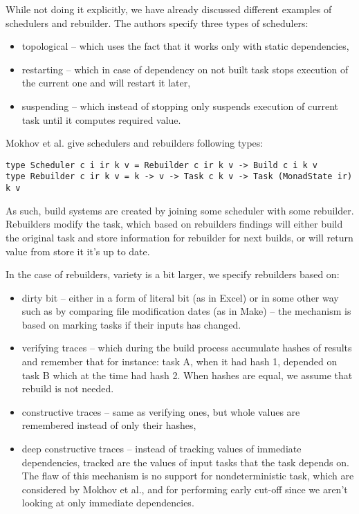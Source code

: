 While not doing it explicitly, we have already discussed different examples of schedulers and rebuilder. The authors specify three types of schedulers:

\begin{itemize}
\item topological -- which uses the fact that it works only with static dependencies,
\item restarting -- which in case of dependency on not built task stops execution of the current one and will restart it later,
\item suspending -- which instead of stopping only suspends execution of current task until it computes required value.
\end{itemize}

Mokhov et al. give schedulers and rebuilders following types:

\begin{lstlisting}
type Scheduler c i ir k v = Rebuilder c ir k v -> Build c i k v
type Rebuilder c ir k v = k -> v -> Task c k v -> Task (MonadState ir) k v
\end{lstlisting}


As such, build systems are created by joining some scheduler with some rebuilder. Rebuilders modify the task, which based on rebuilders findings will either build the original task and store information for rebuilder for next builds, or will return value from store it it's up to date.

In the case of rebuilders, variety is a bit larger, we specify rebuilders based on:
\begin{itemize}
\item dirty bit -- either in a form of literal bit (as in Excel) or in some other way such as by comparing file modification dates (as in Make) -- the mechanism is based on marking tasks if their inputs has changed.
\item verifying traces -- which during the build process accumulate hashes of results and remember that for instance: task A, when it had hash 1, depended on task B which at the time had hash 2. When hashes are equal, we assume that rebuild is not needed.
\item constructive traces -- same as verifying ones, but whole values are remembered instead of only their hashes,
\item deep constructive traces -- instead of tracking values of immediate dependencies, tracked are the values of input tasks that the task depends on. The flaw of this mechanism is no support for nondeterministic task, which are considered by Mokhov et al., and for performing early cut-off since we aren't looking at only immediate dependencies.
\end{itemize}

